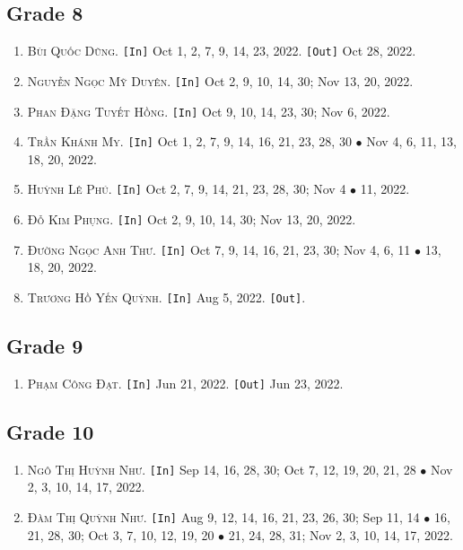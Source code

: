 \documentclass{article}
\numberwithin{equation}{section}
\begin{document}
\subsection{Grade 8}
\begin{enumerate}
	\item \textsc{Bùi Quốc Dũng.} \texttt{[In]} Oct 1, 2, 7, 9, 14, 23, 2022. \texttt{[Out]} Oct 28, 2022.
	\item \textsc{Nguyễn Ngọc Mỹ Duyên.} \texttt{[In]} Oct 2, 9, 10, 14, 30; Nov 13, 20, 2022.
	\item \textsc{Phan Đặng Tuyết Hồng.} \texttt{[In]} Oct 9, 10, 14, 23, 30; Nov 6, 2022.
	\item \textsc{Trần Khánh My.} \texttt{[In]} Oct 1, 2, 7, 9, 14, 16, 21, 23, 28, 30 $\bullet$ Nov 4, 6, 11, 13, 18, 20, 2022.
	\item \textsc{Huỳnh Lê Phú.} \texttt{[In]} Oct 2, 7, 9, 14, 21, 23, 28, 30; Nov 4 $\bullet$ 11, 2022.
	\item \textsc{Đỗ Kim Phụng.} \texttt{[In]} Oct 2, 9, 10, 14, 30; Nov 13, 20, 2022.
	\item \textsc{Đường Ngọc Anh Thư.} \texttt{[In]} Oct 7, 9, 14, 16, 21, 23, 30; Nov 4, 6, 11 $\bullet$ 13, 18, 20, 2022.
	\item \textsc{Trương Hồ Yến Quỳnh.} \texttt{[In]} Aug 5, 2022. \texttt{[Out]}.
\end{enumerate}

\subsection{Grade 9}
\begin{enumerate}
	\item \textsc{Phạm Công Đạt.} \texttt{[In]} Jun 21, 2022. \texttt{[Out]} Jun 23, 2022.
\end{enumerate}

\subsection{Grade 10}
\begin{enumerate}
	\item \textsc{Ngô Thị Huỳnh Như.} \texttt{[In]} Sep 14, 16, 28, 30; Oct 7, 12, 19, 20, 21, 28 $\bullet$ Nov 2, 3, 10, 14, 17, 2022.
	\item \textsc{Đàm Thị Quỳnh Như.} \texttt{[In]} Aug 9, 12, 14, 16, 21, 23, 26, 30; Sep 11, 14 $\bullet$ 16, 21, 28, 30; Oct 3, 7, 10, 12, 19, 20 $\bullet$ 21, 24, 28, 31; Nov 2, 3, 10, 14, 17, 2022.
\end{enumerate}
\end{document}
